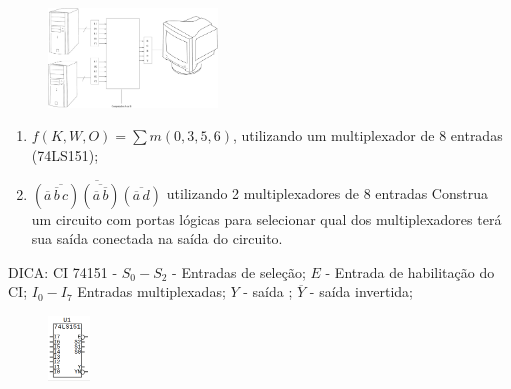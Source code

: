 \documentclass[a4paper,10pt]{article}
\begin{document}
\begin{figure}[htb]
 \centering\includegraphics[width=0.4\textwidth]{multiplexador}
\end{figure}


\begin{enumerate}
 \item $f(K,W,O) = \sum{} m(0,3,5,6)$, utilizando um multiplexador de 8 entradas   (74LS151);
 \item $\overline{(\overline{a}\,\overline{\overline{b}\,c})(\overline{\overline{a}\,\overline{b}})(\overline{\overline{a}\,d})} $ utilizando 2 multiplexadores de 8 entradas   Construa um circuito com portas lógicas para selecionar qual dos multiplexadores terá sua saída conectada na saída do circuito.
 \end{enumerate}
 
DICA: CI 74151 - $S_{0}-S_{2}$ -  Entradas de seleção;  $E$ - Entrada de habilitação do CI;  $I_{0}-I_{7}$ Entradas multiplexadas; $Y$ - saída ; $\overline{Y}$ - saída invertida;  
\begin{figure}[htb]
 \centering\includegraphics[width=0.1\textwidth]{74151}
\end{figure}
\end{document}
